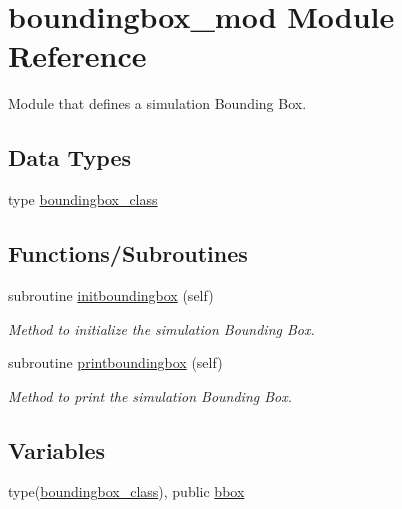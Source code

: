 \hypertarget{namespaceboundingbox__mod}{}\section{boundingbox\+\_\+mod Module Reference}
\label{namespaceboundingbox__mod}


Module that defines a simulation Bounding Box.  


\subsection*{Data Types}
\begin{DoxyCompactItemize}
\item 
type \mbox{\hyperlink{structboundingbox__mod_1_1boundingbox__class}{boundingbox\+\_\+class}}
\end{DoxyCompactItemize}
\subsection*{Functions/\+Subroutines}
\begin{DoxyCompactItemize}
\item 
subroutine \mbox{\hyperlink{namespaceboundingbox__mod_a35e41bb92c19802441dd8d748c3acfb4}{initboundingbox}} (self)
\begin{DoxyCompactList}\small\item\em Method to initialize the simulation Bounding Box. \end{DoxyCompactList}\item 
subroutine \mbox{\hyperlink{namespaceboundingbox__mod_a6ec461b758bc180dc72b5fb23169feca}{printboundingbox}} (self)
\begin{DoxyCompactList}\small\item\em Method to print the simulation Bounding Box. \end{DoxyCompactList}\end{DoxyCompactItemize}
\subsection*{Variables}
\begin{DoxyCompactItemize}
\item 
type(\mbox{\hyperlink{structboundingbox__mod_1_1boundingbox__class}{boundingbox\+\_\+class}}), public \mbox{\hyperlink{namespaceboundingbox__mod_a45e98e492bb546328c98f618a74622ec}{bbox}}
\end{DoxyCompactItemize}


